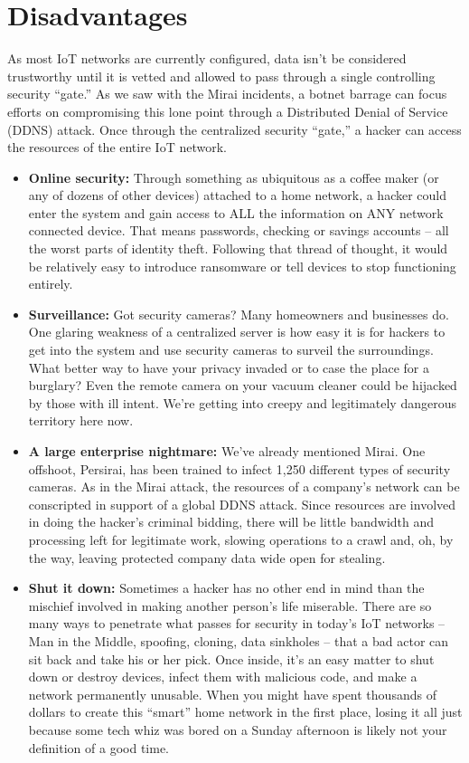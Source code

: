 \section{Disadvantages}
As most IoT networks are currently configured, data isn’t be considered trustworthy until it is vetted and allowed to pass through a single controlling security “gate.” As we saw with the Mirai incidents, a botnet barrage can focus efforts on compromising this lone point through a Distributed Denial of Service (DDNS) attack. Once through the centralized security “gate,” a hacker can access the resources of the entire IoT network. 
\begin{itemize}
	\item[]   \textbf{Online security:} Through something as ubiquitous as a coffee maker (or any of dozens of other devices) attached to a home network, a hacker could enter the system and gain access to ALL the information on ANY network connected device. That means passwords, checking or savings accounts – all the worst parts of identity theft. Following that thread of thought, it would be relatively easy to introduce ransomware or tell devices to stop functioning entirely.
	\item[] \textbf{Surveillance:} Got security cameras? Many homeowners and businesses do. One glaring weakness of a centralized server is how easy it is for hackers to get into the system and use security cameras to surveil the surroundings. What better way to have your privacy invaded or to case the place for a burglary? Even the remote camera on your vacuum cleaner could be hijacked by those with ill intent. We’re getting into creepy and legitimately dangerous territory here now.
	\item[] \textbf{ A large enterprise nightmare:} We’ve already mentioned Mirai. One offshoot, Persirai, has been trained to infect 1,250 different types of security cameras. As in the Mirai attack, the resources of a company’s network can be conscripted in support of a global DDNS attack. Since resources are involved in doing the hacker’s criminal bidding, there will be little bandwidth and processing left for legitimate work, slowing operations to a crawl and, oh, by the way, leaving protected company data wide open for stealing.
	\item[] \textbf{Shut it down:} Sometimes a hacker has no other end in mind than the mischief involved in making another person’s life miserable. There are so many ways to penetrate what passes for security in today’s IoT networks – Man in the Middle, spoofing, cloning, data sinkholes – that a bad actor can sit back and take his or her pick. Once inside, it’s an easy matter to shut down or destroy devices, infect them with malicious code, and make a network permanently unusable. When you might have spent thousands of dollars to create this “smart” home network in the first place, losing it all just because some tech whiz was bored on a Sunday afternoon is likely not your definition of a good time.
\end{itemize}
